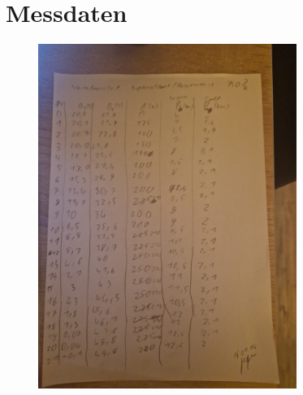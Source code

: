 \appendix

\clearpage
\section{Messdaten}

\begin{figure}
    \centering
    \includegraphics[width=0.75\textwidth, angle=-90,origin=c]{assets/messdaten.jpg}
\end{figure}